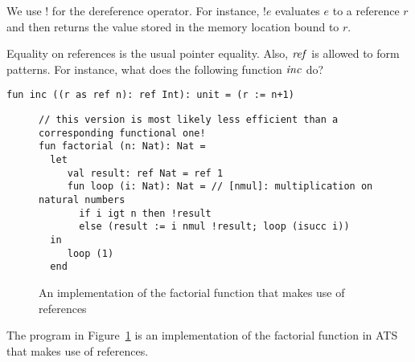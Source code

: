 We use $!$ for the dereference operator. For instance, $!e$ evaluates $e$
to a reference $r$ and then returns the value stored in the memory location
bound to $r$.

Equality on references is the usual pointer equality. Also, ${\it ref}$ is
allowed to form patterns. For instance, what does the following function
${\it inc}$ do?
\begin{verbatim}
fun inc ((r as ref n): ref Int): unit = (r := n+1)
\end{verbatim}

\begin{figure}[thp]
\begin{verbatim}
// this version is most likely less efficient than a corresponding functional one!
fun factorial (n: Nat): Nat =
  let
     val result: ref Nat = ref 1
     fun loop (i: Nat): Nat = // [nmul]: multiplication on natural numbers
       if i igt n then !result
       else (result := i nmul !result; loop (isucc i))
  in
     loop (1)
  end
\end{verbatim}
\caption{An implementation of the factorial function that makes use of references}
\label{figure:ref_factorial}
\end{figure}
The program in Figure~\ref{figure:ref_factorial} is an implementation of
the factorial function in ATS that makes use of references.

